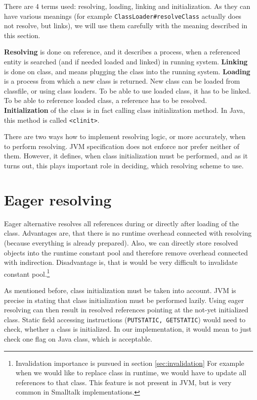 \documentclass[11pt,twoside,a4paper]{book}
\begin{document}
There are 4 terms used: resolving, loading, linking and initialization. 
As they can have various meanings (for example \texttt{ClassLoader\#resolveClass} actually does not resolve, but links), we will use them carefully with the meaning described in this section.

\textbf{Resolving} is done on reference, and it describes a process, when a referenced entity is searched (and if needed loaded and linked) in running system.
\textbf{Linking} is done on class, and means plugging the class into the running system.
\textbf{Loading} is a process from which a new class is returned. 
New class can be loaded from classfile, or using class loaders. 
To be able to use loaded class, it has to be linked.
To be able to reference loaded class, a reference has to be resolved.
\textbf{Initialization} of the class is in fact calling class initialization method.
In Java, this method is called \texttt{<clinit>}.

There are two ways how to implement resolving logic, or more accurately, when to perform resolving. JVM specification \cite{vmspec} does not enforce nor prefer neither of them.
However, it defines, when class initialization must be performed, and as it turns out, this plays important role in deciding, which resolving scheme to use.

\section{Eager resolving}

Eager alternative resolves all references during or directly after loading of the class. 
Advantages are, that there is no runtime overhead connected with resolving (because everything is already prepared).
Also, we can directly store resolved objects into the runtime constant pool and therefore remove overhead connected with indirection. 
Disadvantage is, that is would be very difficult to invalidate constant pool.\footnote{Invalidation importance is pursued in section \ref{sec:invalidation} 
For example when we would like to replace class in runtime, we would have to update all references to that class. 
This feature is not present in JVM, but is very common in Smalltalk implementations.}

As mentioned before, class initialization must be taken into account.
JVM is precise in stating that class initialization must be performed lazily\cite[section~2.17.4]{vmspec}.
Using eager resolving can then result in resolved references pointing at the not-yet initialized class.
Static field accessing instructions (\texttt{PUTSTATIC, GETSTATIC}) would need to check, whether a class is initialized.
In our implementation, it would mean to just check one flag on Java class, which is acceptable.
\end{document}
